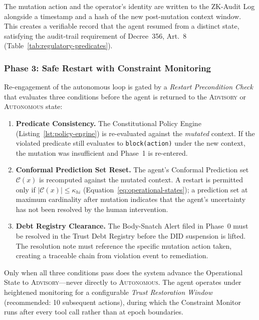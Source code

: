 The mutation action and the operator's identity are written to the ZK-Audit
Log alongside a timestamp and a hash of the new post-mutation context window.
This creates a verifiable record that the agent resumed from a distinct state,
satisfying the audit-trail requirement of Decree~356, Art.~8
(Table~\ref{tab:regulatory-predicates}).

\subsubsection*{Phase 3: Safe Restart with Constraint Monitoring}

Re-engagement of the autonomous loop is gated by a \emph{Restart Precondition
Check} that evaluates three conditions before the agent is returned to the
\textsc{Advisory} or \textsc{Autonomous} state:

\begin{enumerate}
  \item \textbf{Predicate Consistency.}
        The Constitutional Policy Engine (Listing~\ref{lst:policy-engine})
        is re-evaluated against the \emph{mutated} context.  If the
        violated predicate still evaluates to \texttt{block(action)} under
        the new context, the mutation was insufficient and Phase~1 is
        re-entered.

  \item \textbf{Conformal Prediction Set Reset.}
        The agent's Conformal Prediction set $\mathcal{C}(x)$ is
        recomputed against the mutated context.  A restart is permitted
        only if $|\mathcal{C}(x)| \leq \kappa_{hi}$
        (Equation~\eqref{eq:operational-states}); a prediction set at
        maximum cardinality after mutation indicates that the agent's
        uncertainty has not been resolved by the human intervention.

  \item \textbf{Debt Registry Clearance.}
        The Body-Snatch Alert filed in Phase~0 must be resolved in the
        Trust Debt Registry before the DID suspension is lifted.  The
        resolution note must reference the specific mutation action taken,
        creating a traceable chain from violation event to remediation.
\end{enumerate}

Only when all three conditions pass does the system advance the
Operational State to \textsc{Advisory}—never directly to
\textsc{Autonomous}.  The agent operates under heightened monitoring for a
configurable \emph{Trust Restoration Window} (recommended: 10 subsequent
actions), during which the Constraint Monitor runs after every tool call
rather than at epoch boundaries.

